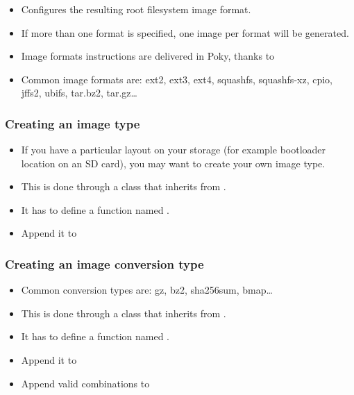 \begin{frame}
  \frametitle{}
  \begin{itemize}
    \item Configures the resulting root filesystem image format.
    \item If more than one format is specified, one image per format
      will be generated.
    \item Image formats instructions are delivered in Poky, thanks to
    \item Common image formats are: ext2, ext3, ext4, squashfs,
      squashfs-xz, cpio, jffs2, ubifs, tar.bz2, tar.gz\dots
  \end{itemize}
\end{frame}

\begin{frame}
  \frametitle{Creating an image type}
  \begin{itemize}
    \item If you have a particular layout on your storage (for example
      bootloader location on an SD card), you may want to create your
      own image type.
    \item This is done through a class that inherits from
      .
    \item It has to define a function named .
    \item Append it to 
  \end{itemize}
\end{frame}

\begin{frame}
  \frametitle{Creating an image conversion type}
  \begin{itemize}
    \item Common conversion types are: gz, bz2, sha256sum, bmap\dots
    \item This is done through a class that inherits from
      .
    \item It has to define a function named .
    \item Append it to 
    \item Append valid combinations to 
  \end{itemize}
\end{frame}

